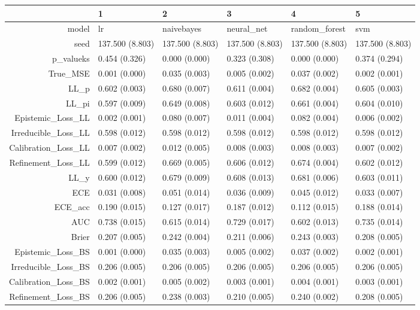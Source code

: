 \begin{table}[ht]
\centering
\begin{tabular}{rlllll}
  \hline
 & 1 & 2 & 3 & 4 & 5 \\ 
  \hline
model & lr & naivebayes & neural\_net & random\_forest & svm \\ 
  seed & 137.500 (8.803) & 137.500 (8.803) & 137.500 (8.803) & 137.500 (8.803) & 137.500 (8.803) \\ 
  p\_valueks & 0.454 (0.326) & 0.000 (0.000) & 0.323 (0.308) & 0.000 (0.000) & 0.374 (0.294) \\ 
  True\_MSE & 0.001 (0.000) & 0.035 (0.003) & 0.005 (0.002) & 0.037 (0.002) & 0.002 (0.001) \\ 
  LL\_p & 0.602 (0.003) & 0.680 (0.007) & 0.611 (0.004) & 0.682 (0.004) & 0.605 (0.003) \\ 
  LL\_pi & 0.597 (0.009) & 0.649 (0.008) & 0.603 (0.012) & 0.661 (0.004) & 0.604 (0.010) \\ 
  Epistemic\_Loss\_LL & 0.002 (0.001) & 0.080 (0.007) & 0.011 (0.004) & 0.082 (0.004) & 0.006 (0.002) \\ 
  Irreducible\_Loss\_LL & 0.598 (0.012) & 0.598 (0.012) & 0.598 (0.012) & 0.598 (0.012) & 0.598 (0.012) \\ 
  Calibration\_Loss\_LL & 0.007 (0.002) & 0.012 (0.005) & 0.008 (0.003) & 0.008 (0.003) & 0.007 (0.002) \\ 
  Refinement\_Loss\_LL & 0.599 (0.012) & 0.669 (0.005) & 0.606 (0.012) & 0.674 (0.004) & 0.602 (0.012) \\ 
  LL\_y & 0.600 (0.012) & 0.679 (0.009) & 0.608 (0.013) & 0.681 (0.006) & 0.603 (0.011) \\ 
  ECE & 0.031 (0.008) & 0.051 (0.014) & 0.036 (0.009) & 0.045 (0.012) & 0.033 (0.007) \\ 
  ECE\_acc & 0.190 (0.015) & 0.127 (0.017) & 0.187 (0.012) & 0.112 (0.015) & 0.188 (0.014) \\ 
  AUC & 0.738 (0.015) & 0.615 (0.014) & 0.729 (0.017) & 0.602 (0.013) & 0.735 (0.014) \\ 
  Brier & 0.207 (0.005) & 0.242 (0.004) & 0.211 (0.006) & 0.243 (0.003) & 0.208 (0.005) \\ 
  Epistemic\_Loss\_BS & 0.001 (0.000) & 0.035 (0.003) & 0.005 (0.002) & 0.037 (0.002) & 0.002 (0.001) \\ 
  Irreducible\_Loss\_BS & 0.206 (0.005) & 0.206 (0.005) & 0.206 (0.005) & 0.206 (0.005) & 0.206 (0.005) \\ 
  Calibration\_Loss\_BS & 0.002 (0.001) & 0.005 (0.002) & 0.003 (0.001) & 0.004 (0.001) & 0.003 (0.001) \\ 
  Refinement\_Loss\_BS & 0.206 (0.005) & 0.238 (0.003) & 0.210 (0.005) & 0.240 (0.002) & 0.208 (0.005) \\ 
   \hline
\end{tabular}
\end{table}
